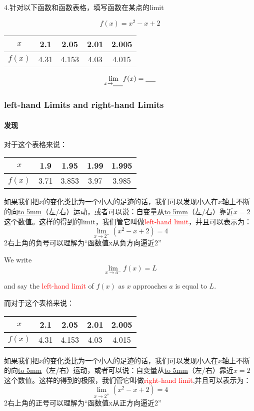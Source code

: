 \documentclass[UTF8]{ctexart}
\begin{document}
4.针对以下函数和函数表格，填写函数在某点的limit

\[f(x) = x^2-x+2\]
\begin{center}
\begin{tabular}{c|c|c|c|c}
\hline
$x$  & 2.1 & 2.05 & 2.01& 2.005 \\
\hline
$f(x)$ & 4.31 & 4.153 & 4.03 & 4.015\\
\hline
\end{tabular}
\end{center}
\[{\lim_{x\to \underline{\hbox to 5mm{}}}} f(x) = \underline{\hbox to 5mm{}}\]

\subsubsection{left-hand Limits and right-hand Limits}
\paragraph{发现}
对于这个表格来说：
\begin{center}
\begin{tabular}{c|c|c|c|c}
\hline
$x$  & 1.9 & 1.95 & 1.99& 1.995 \\
\hline
$f(x)$ & 3.71 & 3.853 & 3.97 & 3.985\\
\hline
\end{tabular}
\end{center}
如果我们把$x$的变化类比为一个小人的足迹的话，我们可以发现小人在$x$轴上不断的向\underline{\hbox to 5mm{}}（左/右）运动，或者可以说：自变量从\underline{\hbox to 5mm{}}（左/右）靠近$x=2$这个数值。这样的得到的limit，我们管它叫做\textcolor{red}{left-hand limit}，并且可以表示为：
\[ {\lim_{x\to 2^- }} (x^2-x+2) = 4\]
2右上角的负号可以理解为“函数值x从负方向逼近2”

We write \[ {\lim_{x\to a^- }} f(x) = L\]

and say the \textcolor{red}{left-hand limit} of $f(x)$ as $x$ approaches $a$ is equal to $L$.

而对于这个表格来说：
\begin{center}
\begin{tabular}{c|c|c|c|c}
\hline
$x$  & 2.1 & 2.05 & 2.01& 2.005 \\
\hline
$f(x)$ & 4.31 & 4.153 & 4.03 & 4.015\\
\hline
\end{tabular}
\end{center}
如果我们把$x$的变化类比为一个小人的足迹的话，我们可以发现小人在$x$轴上不断的向\underline{\hbox to 5mm{}}（左/右）运动，或者可以说：自变量从\underline{\hbox to 5mm{}}（左/右）靠近$x=2$这个数值。这样的得到的极限，我们管它叫做\textcolor{red}{right-hand limit},并且可以表示为：
\[ {\lim_{x\to 2^+ }} (x^2-x+2) = 4\]
2右上角的正号可以理解为“函数值x从正方向逼近2”
\end{document}
